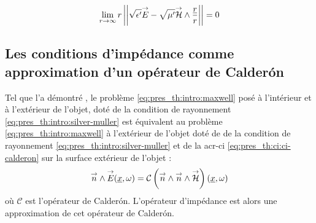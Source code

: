 \begin{equation}
\label{eq:pres_th:intro:silver-muller}
\lim_{r\rightarrow\infty} r \left|\left|\sqrt{\epsilon'}{\overset{\rightarrow}{E}} - \sqrt{\mu'}{\overset{\rightarrow}{\mathcal{H}}}\wedge\dfrac{\underline{r}}{r}\right|\right| = 0
\end{equation} 

\subsection*{Les conditions d'impédance comme approximation d'un opérateur de Calderón}

Tel que l'a démontré \cite[p.~109]{cessenat_mathematical_1996}, le problème \eqref{eq:pres_th:intro:maxwell}  posé à l'intérieur et à l'extérieur de l'objet, doté de la condition de rayonnement \eqref{eq:pres_th:intro:silver-muller} est équivalent au problème \eqref{eq:pres_th:intro:maxwell} à l'extérieur de l'objet doté de de la condition de rayonnement \eqref{eq:pres_th:intro:silver-muller} et de la \gls{acr-ci} \eqref{eq:pres_th:ci:ci-calderon} sur la surface extérieur de l'objet : 
\begin{equation}
\label{eq:pres_th:ci:ci-calderon}
{\overset{\rightarrow}{n}} \wedge {\overset{\rightarrow}{E}} (\underline{x} , \omega ) = \mathcal{C}\left({\overset{\rightarrow}{n}} \wedge {\overset{\rightarrow}{n}} \wedge {\overset{\rightarrow}{\mathcal{H}}}\right)(\underline{x}, \omega )
\end{equation}
où $ \mathcal{C}$ est l'opérateur de Calderón.
L'opérateur d'impédance est alors une approximation de cet opérateur de Calderón.






